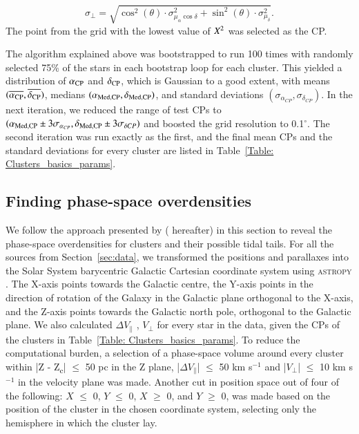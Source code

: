 \documentclass{aa}
\newcommand\arcdeg{\mbox{$^\circ$}}%
\begin{document}
\begin{equation}
\sigma_{\perp} = \sqrt{\cos^2(\theta) \cdot \sigma_{\mu_{\alpha}\cos\delta}^2 + \sin^2(\theta) \cdot \sigma_{\mu_{\delta}}^2}.
\end{equation}
The point from the grid with the lowest value of $X\textsuperscript{2}$ was selected as the CP.

The algorithm explained above was bootstrapped to run 100 times with randomly selected 75\% of the stars in each bootstrap loop for each cluster. This yielded a distribution of $\alpha\textsubscript{CP}$ and $\delta\textsubscript{CP}$, which is Gaussian to a good extent, with means $(\overline{\alpha\textsubscript{CP}},\overline{\delta\textsubscript{CP}})$, medians $({\alpha\textsubscript{Med,CP}},{\delta\textsubscript{Med,CP}})$, and standard deviations $(\sigma_{\alpha_{CP}},\sigma_{\delta_{CP}})$. In the next iteration, we reduced the range of test CPs to $({\alpha\textsubscript{Med,CP}} \pm 3\sigma_{\alpha_{CP}},{\delta\textsubscript{Med,CP}} \pm 3\sigma_{\delta{CP}} )$ and boosted the grid resolution to 0.1\arcdeg. The second iteration was run  exactly as the first, and the final mean CPs and the standard deviations for every cluster are listed in Table~\ref{Table: Clusters_basics_params}.  



\subsection{Finding phase-space overdensities} \label{sec:finding_overdensity}

We follow the approach presented by \citet{2019A&A...627A...4Roser_Praesepe} ( hereafter) in this section to reveal the phase-space overdensities for clusters and their possible tidal tails. For all the sources from Section~\ref{sec:data}, we transformed the positions and parallaxes into the Solar System barycentric Galactic Cartesian coordinate system using \textsc{astropy} \citep{astropy:2022}. The X-axis points towards the Galactic centre, the Y-axis points in the direction of rotation of the Galaxy in the Galactic plane orthogonal to the X-axis, and the Z-axis points towards the Galactic north pole, orthogonal to the Galactic plane. We also calculated $\Delta V_{\parallel}$ , $ V_{\perp}$ for every star in the data, given the CPs of the clusters in Table~\ref{Table: Clusters_basics_params}. To reduce the computational burden, a selection of a phase-space volume around every cluster within |Z - Z\textsubscript{c}| $\leq$ 50 pc in the Z plane, |$\Delta V_{\parallel}$| $\leq$ 50 km s$^{-1}$ and |$ V_{\perp}$| $\leq$ 10 km s$^{-1}$ in the velocity plane was made. Another cut in position space out of four of the following: $X$ $\leq$ 0, $Y$ $\leq$ 0, $X$ $\geq$ 0, and $Y$ $\geq$ 0, was made based on the position of the cluster in the chosen coordinate system, selecting only the hemisphere in which the cluster lay. 
\end{document}
